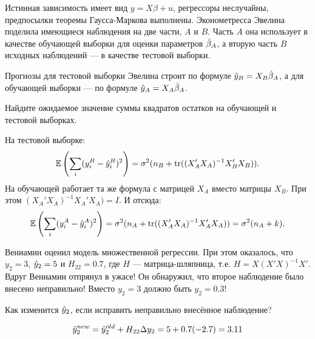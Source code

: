 \begin{problem}
  Истинная зависимость имеет вид $y = X \beta + u$, регрессоры неслучайны, предпосылки теоремы Гаусса-Маркова выполнены.
	Эконометресса Эвелина поделила имеющиеся наблюдения на две части, $A$ и $B$. 
  Часть $A$ она использует в качестве обучающей выборки для оценки параметров $\hat{\beta}_A$, 
  а вторую часть $B$ исходных наблюдений — в качестве тестовой выборки. 
  
	Прогнозы для тестовой выборки Эвелина строит по формуле $\hat y_B = X_B\hat{\beta}_A$, 
  а для обучающей выборки — по формуле $\hat y_A = X_A\hat{\beta}_A$.

  Найдите ожидаемое значение суммы квадратов остатков на обучающей и тестовой выборках. 

\begin{sol}
  На тестовой выборке:
  \[
    \mathbb{E}\left(  \sum_i (y_i^B - \hat y_i^B)^2  \right) = \sigma^2( n_B  + \operatorname{tr}((X_A'X_A)^{-1}X_B'X_B)).
  \]
  На обучающей работает та же формула с матрицей $X_A$ вместо матрицы $X_B$. 
  При этом $(X_A'X_A)^{-1}X_A'X_A) = I$. И отсюда:
  \[
    \mathbb{E}\left(  \sum_i (y_i^A - \hat y_i^A)^2  \right) = \sigma^2( n_A  + \operatorname{tr}((X_A'X_A)^{-1}X_A'X_A)) = \sigma^2( n_A + k).
  \]
\end{sol}
\end{problem}


\begin{problem}
Вениамин оценил модель множественной регрессии. При этом оказалось, что $y_2=3$, $\hat{y}_2=5$ и $H_{22}=0.7$, где $H$ — матрица-шляпница, т.е. $H=X(X'X)^{-1}X'$. Вдруг Вениамин отпрянул в ужасе! Он обнаружил, что второе наблюдение было внесено неправильно! Вместо $y_2=3$ должно быть $y_2=0.3$!

Как изменится $\hat{y}_2$, если исправить неправильно внесённое наблюдение?
\begin{sol}
\[
\hat{y}_2^{new} = \hat{y}_2^{old} + H_{22} \Delta y_2 = 5 + 0.7(-2.7) = 3.11
\]
\end{sol}
\end{problem}



